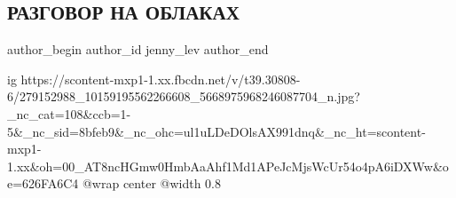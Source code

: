  
 
 
 
 
 
\subsection{РАЗГОВОР НА ОБЛАКАХ}
\label{sec:24_04_2022.fb.jenny_lev.1.razgovor_na_oblakah}
 
\ifcmt
 author_begin
   author_id jenny_lev
 author_end
\fi


\ifcmt
  ig https://scontent-mxp1-1.xx.fbcdn.net/v/t39.30808-6/279152988_10159195562266608_5668975968246087704_n.jpg?_nc_cat=108&ccb=1-5&_nc_sid=8bfeb9&_nc_ohc=ul1uLDeDOlsAX991dnq&_nc_ht=scontent-mxp1-1.xx&oh=00_AT8ncHGmw0HmbAaAhf1Md1APeJcMjsWcUr54o4pA6iDXWw&oe=626FA6C4
  @wrap center
  @width 0.8
\fi

